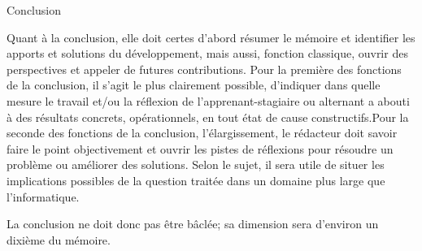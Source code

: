 
\vfill
Conclusion

Quant à la conclusion, elle doit certes d’abord résumer le mémoire et identifier les apports et  solutions du  développement,  mais  aussi,  fonction  classique, ouvrir  des  perspectives et appeler de futures contributions. Pour la première des fonctions de la conclusion, il s’agit le plus clairement possible, d’indiquer dans quelle mesure le travail et/ou la réflexion de l’apprenant-stagiaire ou alternant a abouti à des résultats concrets, opérationnels, en tout état de cause constructifs.Pour la seconde des fonctions de la conclusion, l’élargissement, le rédacteur doit savoir faire le  point  objectivement  et  ouvrir  les  pistes  de réflexions pour  résoudre  un  problème  ou améliorer des solutions. Selon le sujet, il sera utile de situer les implications possibles de la question traitée dans un domaine plus large que l’informatique.

La  conclusion  ne  doit  donc  pas  être  bâclée;  sa  dimension sera d’environ un dixième du mémoire.
\vfill
